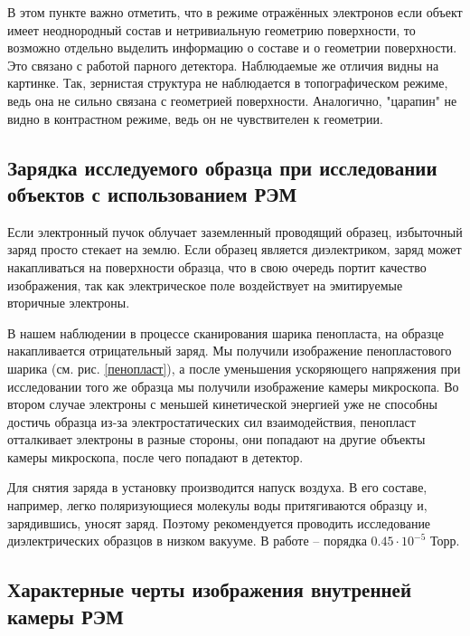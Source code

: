 \documentclass[a4paper,12pt]{article}	%
\begin{document}
\medskip

\noindent В этом пункте важно отметить, что в режиме отражённых электронов если объект имеет неоднородный состав и нетривиальную геометрию поверхности, то возможно отдельно выделить информацию о составе и о геометрии поверхности. Это связано с работой парного детектора. Наблюдаемые же отличия видны на картинке. Так, зернистая структура не наблюдается в топографическом режиме, ведь она не сильно связана с геометрией поверхности. Аналогично, "царапин" не видно в контрастном режиме, ведь он не чувствителен к геометрии.

    \subsection{Зарядка исследуемого образца при исследовании объектов с использованием РЭМ}
        
\noindent Если электронный пучок облучает заземленный проводящий образец, избыточный заряд просто стекает на землю. Если образец является диэлектриком, заряд может накапливаться на поверхности образца, что в свою очередь портит качество изображения, так как электрическое поле воздействует на эмитируемые вторичные электроны.

\medskip
        
\noindent В нашем наблюдении в процессе сканирования шарика пенопласта, на образце накапливается отрицательный заряд. Мы получили изображение пенопластового шарика (см. рис. \ref{пенопласт}), а после уменьшения ускоряющего напряжения при исследовании того же образца мы получили изображение камеры микроскопа. Во втором случае электроны с меньшей кинетической энергией уже не способны достичь образца из-за электростатических сил взаимодействия, пенопласт отталкивает электроны в разные стороны, они попадают на другие объекты камеры микроскопа, после чего попадают в детектор.

\medskip

\noindent Для снятия заряда в установку производится напуск воздуха. В его составе, например, легко поляризующиеся молекулы воды притягиваются образцу и, зарядившись, уносят заряд. Поэтому рекомендуется проводить исследование диэлектрических образцов в низком вакууме. В работе -- порядка $0.45\cdot10^{-5}$ Торр.

 
    \subsection{Характерные черты изображения внутренней камеры РЭМ}
\end{document}
